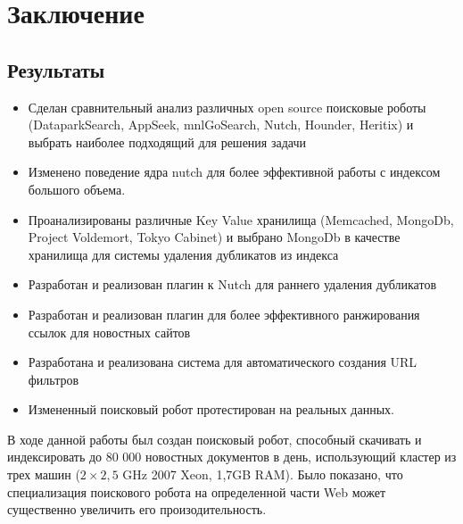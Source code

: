 \chapter*{Заключение} 
\section*{Результаты}
\begin{itemize}
 \item Сделан сравнительный анализ различных open source поисковые роботы (DataparkSearch,
AppSeek, mnlGoSearch, Nutch, Hounder, Heritix) и выбрать наиболее подходящий для
решения задачи
 \item Изменено поведение ядра nutch для более эффективной работы с индексом большого объема.
 \item Проанализированы различные Key Value хранилища (Memcached, MongoDb, Project Voldemort, Tokyo Cabinet) и выбрано MongoDb в качестве хранилища для системы удаления дубликатов из индекса
 \item Разработан и реализован плагин к Nutch для раннего удаления дубликатов
 \item Разработан и реализован плагин для более эффективного ранжирования ссылок для новостных сайтов
 \item Разработана и реализована система для автоматического создания URL фильтров
 \item Измененный поисковый робот протестирован на реальных данных.
\end{itemize}
В ходе данной работы был создан поисковый робот, способный скачивать и индексировать до 80 000 новостных документов в день, использующий кластер из трех машин ($2\times2,5$ GHz 2007 Xeon, 1,7GB RAM). Было показано, что специализация поискового робота на определенной части Web может существенно увеличить его произодительность.